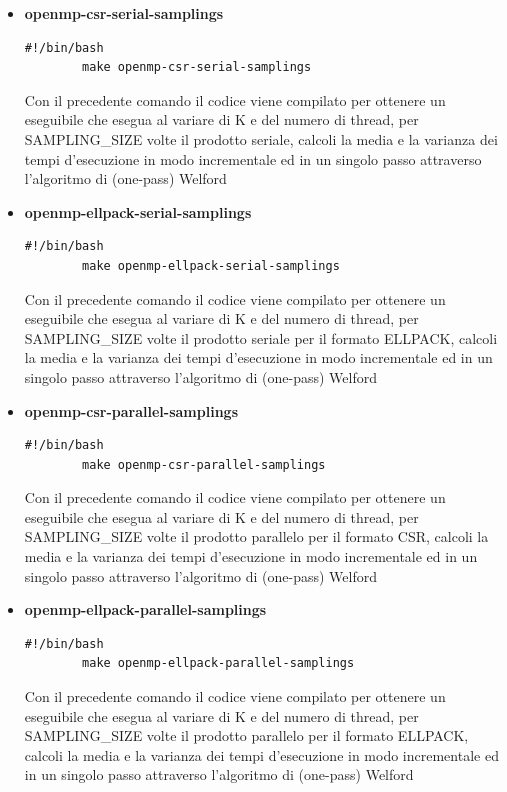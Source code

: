 \documentclass{article}
\begin{document}
\begin{itemize}
\begin{itemize}
        \item \textbf{openmp-csr-serial-samplings}
         \begin{lstlisting}[style=bashstyle]
        #!/bin/bash
        make openmp-csr-serial-samplings
        \end{lstlisting} Con il precedente comando il codice viene compilato per ottenere un eseguibile che esegua al variare di K e del numero di thread, per SAMPLING\_SIZE volte il prodotto seriale, calcoli la media e la varianza dei tempi d'esecuzione in modo incrementale ed in un singolo passo attraverso l'algoritmo di (one-pass) Welford
        \item \textbf{openmp-ellpack-serial-samplings}
        \begin{lstlisting}[style=bashstyle]
        #!/bin/bash
        make openmp-ellpack-serial-samplings
        \end{lstlisting} Con il precedente comando il codice viene compilato per ottenere un eseguibile che esegua al variare di K e del numero di thread, per SAMPLING\_SIZE volte il prodotto seriale per il formato ELLPACK, calcoli la media e la varianza dei tempi d'esecuzione in modo incrementale ed in un singolo passo attraverso l'algoritmo di (one-pass) Welford
        \item \textbf{openmp-csr-parallel-samplings}
        \begin{lstlisting}[style=bashstyle]
        #!/bin/bash
        make openmp-csr-parallel-samplings
        \end{lstlisting} Con il precedente comando il codice viene compilato per ottenere un eseguibile che esegua al variare di K e del numero di thread, per SAMPLING\_SIZE volte il prodotto parallelo per il formato CSR, calcoli la media e la varianza dei tempi d'esecuzione in modo incrementale ed in un singolo passo attraverso l'algoritmo di (one-pass) Welford
        \item \textbf{openmp-ellpack-parallel-samplings}
        \begin{lstlisting}[style=bashstyle]
        #!/bin/bash
        make openmp-ellpack-parallel-samplings
        \end{lstlisting} Con il precedente comando il codice viene compilato per ottenere un eseguibile che esegua al variare di K e del numero di thread, per SAMPLING\_SIZE volte il prodotto parallelo per il formato ELLPACK, calcoli la media e la varianza dei tempi d'esecuzione in modo incrementale ed in un singolo passo attraverso l'algoritmo di (one-pass) Welford
    \end{itemize}
    

\end{itemize}
\end{document}
